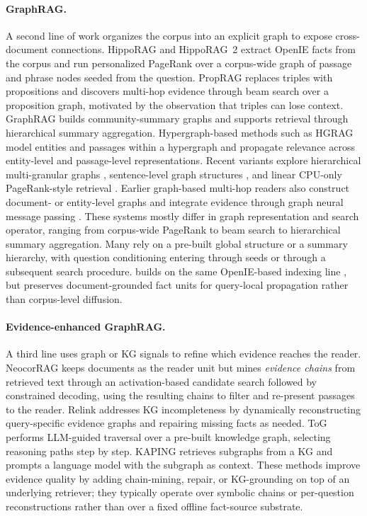 \paragraph{GraphRAG.}
A second line of work organizes the corpus into an explicit graph
to expose cross-document connections. HippoRAG
\citep{jimenez2024hipporag} and HippoRAG~2
\citep{gutierrez2025hipporag} extract OpenIE facts from the corpus
and run personalized PageRank over a corpus-wide graph of passage
and phrase nodes seeded from the question. PropRAG
\citep{wang2025proprag} replaces triples with propositions and
discovers multi-hop evidence through beam search over a proposition
graph, motivated by the observation that triples can lose context.
GraphRAG \citep{edge2024graphrag} builds community-summary graphs
and supports retrieval through hierarchical summary aggregation.
Hypergraph-based methods such as HGRAG \citep{hgrag2024} model
entities and passages within a hypergraph and propagate relevance
across entity-level and passage-level representations. Recent
variants explore hierarchical multi-granular graphs
\citep{hu2026mgrangrag}, sentence-level graph structures
\citep{liang2026sentgraph}, and linear CPU-only PageRank-style
retrieval \citep{wang2026sprig}. Earlier graph-based multi-hop
readers also construct document- or entity-level graphs and
integrate evidence through graph neural message passing
\citep{qiu2019dfgn,song2022evidenceintegration}. These systems
mostly differ in graph representation and search operator, ranging
from corpus-wide PageRank to beam search to hierarchical summary
aggregation. Many rely on a pre-built global structure or a summary
hierarchy, with question conditioning entering through seeds or
through a subsequent search procedure. \methodname{} builds on the
same OpenIE-based indexing line
\citep{angeli2015leveraging,gutierrez2025hipporag}, but preserves
document-grounded fact units for query-local propagation rather
than corpus-level diffusion.

\paragraph{Evidence-enhanced GraphRAG.}
A third line uses graph or KG signals to refine which evidence
reaches the reader. NeocorRAG \citep{peng2026neocorrag} keeps
documents as the reader unit but mines \emph{evidence chains} from
retrieved text through an activation-based candidate search
followed by constrained decoding, using the resulting chains to
filter and re-present passages to the reader. Relink
\citep{huang2026relink} addresses KG incompleteness by dynamically
reconstructing query-specific evidence graphs and repairing missing
facts as needed. ToG \citep{sun2024tog} performs LLM-guided
traversal over a pre-built knowledge graph, selecting reasoning
paths step by step. KAPING \citep{baek2023kaping} retrieves
subgraphs from a KG and prompts a language model with the
subgraph as context. These methods improve evidence quality by
adding chain-mining, repair, or KG-grounding on top of an
underlying retriever; they typically operate over symbolic chains
or per-question reconstructions rather than over a fixed offline
fact-source substrate.

